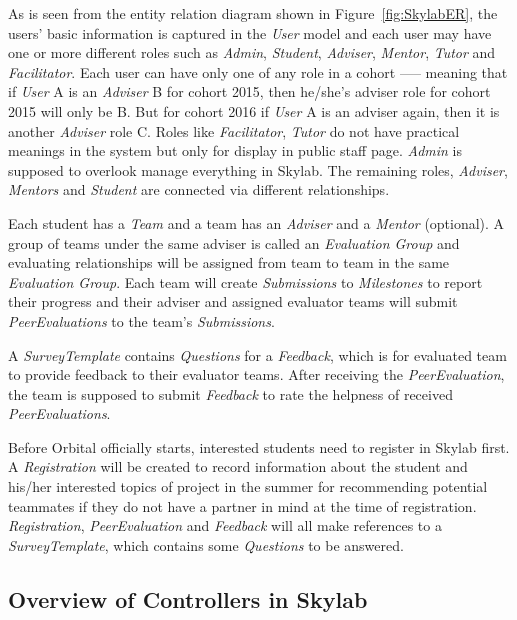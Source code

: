 As is seen from the entity relation diagram shown in Figure~\ref{fig:SkylabER}, the users' basic information is captured in the \textit{User} model and each user may have one or more different roles such as \textit{Admin}, \textit{Student}, \textit{Adviser}, \textit{Mentor}, \textit{Tutor} and \textit{Facilitator}.
 Each user can have only one of any role in a cohort —-- meaning that if \textit{User} A is an \textit{Adviser} B for cohort 2015, then he/she's adviser role for cohort 2015 will only be B. But for cohort 2016 if \textit{User} A is an adviser again, then it is another \textit{Adviser} role C. Roles like \textit{Facilitator}, \textit{Tutor} do not have practical meanings in the system but only for display in public staff page. \textit{Admin} is supposed to overlook manage everything in Skylab. The remaining roles, \textit{Adviser}, \textit{Mentors} and \textit{Student} are connected via different relationships.

Each student has a \textit{Team} and a team has an \textit{Adviser} and a \textit{Mentor} (optional). A group of teams under the same adviser is called an \textit{Evaluation Group} and evaluating relationships will be assigned from team to team in the same \textit{Evaluation Group}. Each team will create \textit{Submissions} to \textit{Milestones} to report their progress and their adviser and assigned evaluator teams will submit \textit{PeerEvaluations} to the team's \textit{Submissions}.

A \textit{SurveyTemplate} contains \textit{Questions} for a \textit{Feedback}, which is for evaluated team to provide feedback to their evaluator teams. After receiving the \textit{PeerEvaluation}, the team is supposed to submit \textit{Feedback} to rate the helpness of received \textit{PeerEvaluations}.

Before Orbital officially starts, interested students need to register in Skylab first. A \textit{Registration} will be created to record information about the student and his/her interested topics of project in the summer for recommending potential teammates if they do not have a partner in mind at the time of registration. \textit{Registration}, \textit{PeerEvaluation} and \textit{Feedback} will all make references to a \textit{SurveyTemplate}, which contains some \textit{Questions} to be answered.

\subsection{Overview of Controllers in Skylab}

